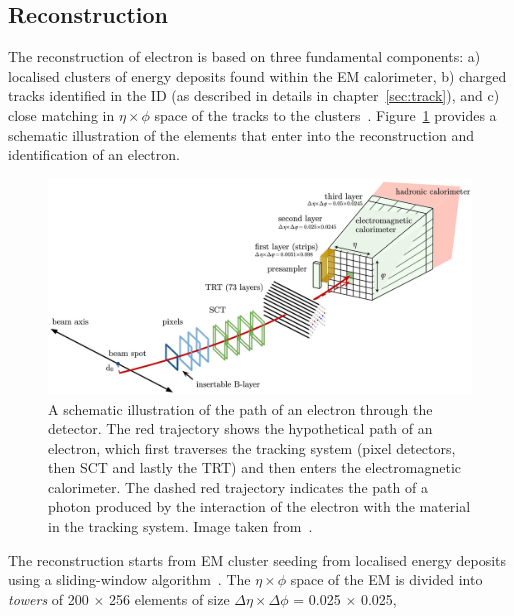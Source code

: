 \subsection{Reconstruction}
The reconstruction of electron is based on three fundamental components: 
a) localised clusters of energy deposits found within the EM calorimeter, 
b) charged tracks identified in the ID (as described in details in chapter~\ref{sec:track}),
and c) close matching in $\eta \times \phi$ space of the tracks to the clusters~\cite{PERF-2017-01}.
Figure~\ref{fig:electron_recon} provides a schematic illustration of the elements that enter into
the reconstruction and identification of an electron. 
\begin{figure}[bht]
    \begin{centering}	
    \includegraphics[width=1.0\textwidth]{Reconstruction_plots/electron.jpg}
    \caption{A schematic illustration of the path of an electron through the detector. 
    The red trajectory shows the 
    hypothetical path of an electron, which first traverses the tracking system (pixel detectors, then SCT
    and lastly the TRT) and then enters the electromagnetic calorimeter. 
    The dashed red trajectory indicates the path of a
    photon produced by the interaction of the electron with the material in the tracking system. 
    Image taken from~\cite{PERF-2017-01}.
        }
    \label{fig:electron_recon}
    \end{centering}
\end{figure}
The reconstruction starts from EM cluster seeding from localised energy deposits 
using a sliding-window algorithm~\cite{sliding-window}.
The $\eta \times \phi$ space of the EM is divided into \textit{towers} of 200 $\times$ 256
elements of size $\Delta\eta \times \Delta\phi$ = 0.025 $\times$ 0.025, 
